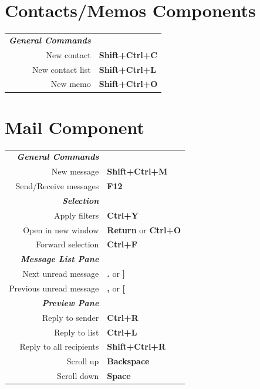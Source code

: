 \documentclass[12pt]{article}
\begin{document}
\begin{landscape}
\begin{center}
\begin{multicols}{2}
	\section*{Contacts/Memos Components}
	\begin{tabular*}{4in}{rp{1.5in}}
		\textit{\textbf{General Commands}}	&					\\
		New contact				& \textbf{Shift+Ctrl+C}			\\
		New contact list			& \textbf{Shift+Ctrl+L}			\\
		New memo				& \textbf{Shift+Ctrl+O}			\\
	\end{tabular*}
	\section*{Mail Component}
	\begin{tabular*}{4in}{rp{1.5in}}
		\textit{\textbf{General Commands}}	&					\\
		New message				& \textbf{Shift+Ctrl+M}			\\
		\vspace{1.5mm}
		Send/Receive messages			& \textbf{F12}				\\
		\textit{\textbf{Selection}}		&					\\
		Apply filters				& \textbf{Ctrl+Y}			\\
		Open in new window 			& \textbf{Return} or \textbf{Ctrl+O}	\\
		\vspace{1.5mm}
		Forward selection			& \textbf{Ctrl+F}			\\
		\textit{\textbf{Message List Pane}}	&					\\
		Next unread message			& \textbf{.} or \textbf{]}		\\
		\vspace{1.5mm}
		Previous unread message			& \textbf{,} or \textbf{[}		\\
		\textit{\textbf{Preview Pane}}		&					\\
		Reply to sender				& \textbf{Ctrl+R}			\\
		Reply to list				& \textbf{Ctrl+L}			\\
		Reply to all recipients 		& \textbf{Shift+Ctrl+R}			\\
		Scroll up				& \textbf{Backspace}			\\
		Scroll down				& \textbf{Space}			\\
	\end{tabular*}

\end{multicols}
\end{center}
\end{landscape}
\end{document}
